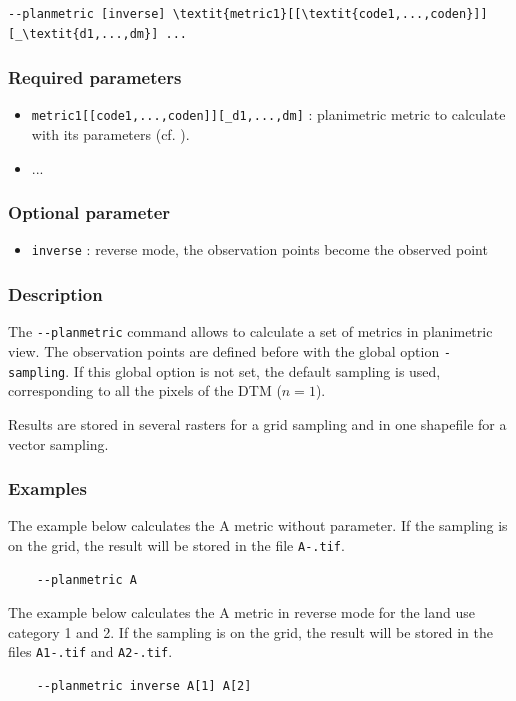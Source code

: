 \documentclass{report}
\begin{document}
\begin{Verbatim}[commandchars=\\\{\}]
--planmetric [inverse] \textit{metric1}[[\textit{code1,...,coden}]][_\textit{d1,...,dm}] ...
\end{Verbatim}

\subsubsection{Required parameters}
\begin{itemize}
	\item \verb|metric1[[code1,...,coden]][_d1,...,dm]| : planimetric metric to calculate with its parameters (cf. ).
	\item ...
\end{itemize}

\subsubsection{Optional parameter}
\begin{itemize}
	\item \verb|inverse| : reverse mode, the observation points become the observed point
\end{itemize}

\subsubsection{Description}
The \verb|--planmetric| command allows to calculate a set of metrics in planimetric view.
The observation points are defined before with the global option \verb|-sampling|. 
If this global option is not set, the default sampling is used, corresponding to all the pixels of the DTM ($n=1$).

Results are stored in several rasters for a grid sampling and in one shapefile for a vector sampling.

\subsubsection{Examples}
The example below calculates the A metric without parameter. If the sampling is on the grid, the result will be stored in the file \verb|A-.tif|.
\begin{Verbatim}
	--planmetric A
\end{Verbatim}

The example below calculates the A metric in reverse mode for the land use category 1 and 2. If the sampling is on the grid, the result will be stored in the files \verb|A1-.tif| and \verb|A2-.tif|.
\begin{Verbatim}
	--planmetric inverse A[1] A[2]
\end{Verbatim}
\end{document}
